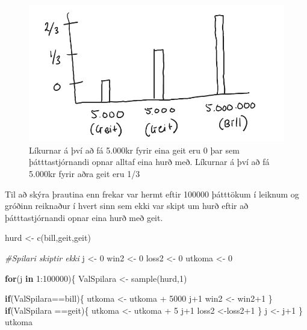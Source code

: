 \documentclass[
]{article}
\newenvironment{Shaded}{\begin{snugshade}}{\end{snugshade}}
\newcommand{\CommentTok}[1]{\textcolor[rgb]{0.56,0.35,0.01}{\textit{#1}}}
\newcommand{\ControlFlowTok}[1]{\textcolor[rgb]{0.13,0.29,0.53}{\textbf{#1}}}
\newcommand{\DecValTok}[1]{\textcolor[rgb]{0.00,0.00,0.81}{#1}}
\newcommand{\FunctionTok}[1]{\textcolor[rgb]{0.00,0.00,0.00}{#1}}
\newcommand{\NormalTok}[1]{#1}
\newcommand{\OtherTok}[1]{\textcolor[rgb]{0.56,0.35,0.01}{#1}}
\newcommand{\SpecialCharTok}[1]{\textcolor[rgb]{0.00,0.00,0.00}{#1}}
\newcommand{\StringTok}[1]{\textcolor[rgb]{0.31,0.60,0.02}{#1}}
\begin{document}
\begin{figure}
\centering
\includegraphics{graf.jpg}
\caption{Líkurnar á því að fá 5.000kr fyrir eina geit eru 0 þar sem
þátttastjórnandi opnar alltaf eina hurð með. Líkurnar á því að fá
5.000kr fyrir aðra geit eru 1/3}
\end{figure}

Til að skýra þrautina enn frekar var hermt eftir 100000 þátttökum í
leiknum og gróðinn reiknaður í hvert sinn sem ekki var skipt um hurð
eftir að þátttastjórnandi opnar eina hurð með geit.

\begin{Shaded}
\begin{Highlighting}[]
\NormalTok{hurd }\OtherTok{\textless{}{-}} \FunctionTok{c}\NormalTok{(}\StringTok{\textquotesingle{}bill\textquotesingle{}}\NormalTok{,}\StringTok{\textquotesingle{}geit\textquotesingle{}}\NormalTok{,}\StringTok{\textquotesingle{}geit\textquotesingle{}}\NormalTok{)}

\CommentTok{\#Spilari skiptir ekki}
\NormalTok{j }\OtherTok{\textless{}{-}} \DecValTok{0}
\NormalTok{win2 }\OtherTok{\textless{}{-}} \DecValTok{0}
\NormalTok{loss2 }\OtherTok{\textless{}{-}} \DecValTok{0}
\NormalTok{utkoma }\OtherTok{\textless{}{-}} \DecValTok{0}

\ControlFlowTok{for}\NormalTok{(j }\ControlFlowTok{in} \DecValTok{1}\SpecialCharTok{:}\DecValTok{100000}\NormalTok{)\{}
\NormalTok{  ValSpilara }\OtherTok{\textless{}{-}} \FunctionTok{sample}\NormalTok{(hurd,}\DecValTok{1}\NormalTok{)}
  
  \ControlFlowTok{if}\NormalTok{(ValSpilara}\SpecialCharTok{==}\StringTok{\textquotesingle{}bill\textquotesingle{}}\NormalTok{)\{}
\NormalTok{    utkoma }\OtherTok{\textless{}{-}}\NormalTok{ utkoma }\SpecialCharTok{+} \DecValTok{5000}
\NormalTok{    j}\SpecialCharTok{+}\DecValTok{1}
\NormalTok{    win2 }\OtherTok{\textless{}{-}}\NormalTok{ win2}\SpecialCharTok{+}\DecValTok{1}
\NormalTok{  \}}
  \ControlFlowTok{if}\NormalTok{(ValSpilara }\SpecialCharTok{==}\StringTok{\textquotesingle{}geit\textquotesingle{}}\NormalTok{)\{}
\NormalTok{    utkoma }\OtherTok{\textless{}{-}}\NormalTok{ utkoma }\SpecialCharTok{+} \DecValTok{5}
\NormalTok{    j}\SpecialCharTok{+}\DecValTok{1}
\NormalTok{    loss2 }\OtherTok{\textless{}{-}}\NormalTok{loss2}\SpecialCharTok{+}\DecValTok{1}
\NormalTok{  \}}
\NormalTok{  j }\OtherTok{\textless{}{-}}\NormalTok{ j}\SpecialCharTok{+}\DecValTok{1}
\NormalTok{\}}
\NormalTok{utkoma}
\end{Highlighting}
\end{Shaded}
\end{document}
